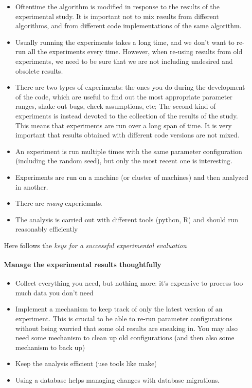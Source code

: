 \documentclass{llncs}
\begin{document}
\begin{itemize}
\item Oftentime the algorithm is modified in response to the results
  of the experimental study. It is important not to mix results from
  different algorithms, and from different code implementations of the
  same algorithm.
\item Usually running the experiments takes a long time, and we don't
  want to re-run all the experiments every time. However, when
  re-using results from old experiments, we need to be sure that we
  are not including undesired and obsolete results.
\item There are two types of experiments: the ones you do during the
  development of the code, which are useful to find out the most
  appropriate parameter ranges, shake out bugs, check assumptions,
  etc; The second kind of experiments is instead devoted to the
  collection of the results of the study. This means that experiments
  are run over a long span of time. It is very important that results
  obtained with different code versions are not mixed.
\item An experiment is run multiple times with the same parameter
  configuration (including the random seed), but only the most recent
  one is interesting.
\item Experiments are run on a machine (or cluster of machines) and then
  analyzed in another.
\item There are \emph{many} experiemnts.
\item The analysis is carried out with different tools (python, R) and
  should run reasonably efficiently
\end{itemize}

Here follows the \emph{keys for a successful experimental evaluation}

\paragraph{Manage the experimental results thoughtfully}

\begin{itemize}
\item Collect everything you need, but nothing more: it's expensive to process too
  much data you don't need
\item Implement a mechanism to keep track of only the latest version of an
  experiment. This is crucial to be able to re-run parameter configurations
  without being worried that some old results are sneaking in. You may also
  need some mechanism to clean up old configurations (and then also some
  mechanism to back up)
\item Keep the analysis efficient (use tools like make)
\item Using a database helps managing changes with database migrations.
\end{itemize}
\end{document}
